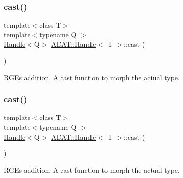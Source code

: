 \subsubsection{\texorpdfstring{cast()}{cast()}\hspace{0.1cm}{\footnotesize\ttfamily [1/2]}}
{\footnotesize\ttfamily template$<$class T$>$ \\
template$<$typename Q $>$ \\
\mbox{\hyperlink{classADAT_1_1Handle}{Handle}}$<$Q$>$ \mbox{\hyperlink{classADAT_1_1Handle}{A\+D\+A\+T\+::\+Handle}}$<$ T $>$\+::cast (\begin{DoxyParamCaption}{ }\end{DoxyParamCaption})\hspace{0.3cm}{\ttfamily [inline]}}



R\+GE\textquotesingle{}s addition. A cast function to morph the actual type. 

\mbox{\label{classADAT_1_1Handle_aac9634a0530419244ef076e63ff2b984}} 
\subsubsection{\texorpdfstring{cast()}{cast()}\hspace{0.1cm}{\footnotesize\ttfamily [2/2]}}
{\footnotesize\ttfamily template$<$class T$>$ \\
template$<$typename Q $>$ \\
\mbox{\hyperlink{classADAT_1_1Handle}{Handle}}$<$Q$>$ \mbox{\hyperlink{classADAT_1_1Handle}{A\+D\+A\+T\+::\+Handle}}$<$ T $>$\+::cast (\begin{DoxyParamCaption}{ }\end{DoxyParamCaption})\hspace{0.3cm}{\ttfamily [inline]}}



R\+GE\textquotesingle{}s addition. A cast function to morph the actual type. 

\mbox{\label{classADAT_1_1Handle_a86f851b3a2e8a6084e50bfad306260f4}} 
